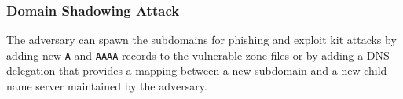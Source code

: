 





\subsubsection{Domain Shadowing Attack}

The adversary can spawn the subdomains for phishing and exploit kit attacks by adding new \texttt{A} and \texttt{AAAA} records to the vulnerable zone files or by adding a DNS delegation that provides a mapping between a new subdomain and a new child name server maintained by the adversary. %

